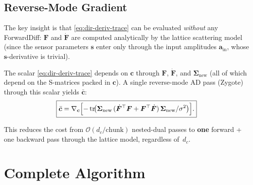 \documentclass[11pt]{article}
\newcommand{\tr}{\operatorname{tr}}
\newcommand{\bs}{\bm{s}}
\newcommand{\bc}{\bm{c}}
\newcommand{\Snew}{\bm{\Sigma}_{\mathrm{new}}}
\theoremstyle{definition}
\begin{document}
\subsection{Reverse-Mode Gradient}

The key insight is that \eqref{eq:dir-deriv-trace} can be evaluated
\emph{without} any ForwardDiff: $\bm{F}$ and $\dot{\bm{F}}$ are computed
analytically by the lattice scattering model (since the sensor parameters
$\bs$ enter only through the input amplitudes $\bm{a}_{\mathrm{in}}$,
whose $\bs$-derivative is trivial).

The scalar \eqref{eq:dir-deriv-trace} depends on $\bc$ through $\bm{F}$,
$\dot{\bm{F}}$, and $\Snew$ (all of which depend on the S-matrices
packed in $\bc$).  A single reverse-mode AD pass (Zygote) through this
scalar yields $\bar{\bc}$:
\begin{equation}
  \boxed{%
    \bar{\bc} = \nabla_{\bc}\Bigl[
      -\tr\!\bigl(\Snew\,(\dot{\bm{F}}^\top\bm{F}
      + \bm{F}^\top\dot{\bm{F}})\,\Snew/\sigma^2\bigr)
    \Bigr].
  }
  \label{eq:cbar-analytical}
\end{equation}

This reduces the cost from $\mathcal{O}(d_c/\text{chunk})$ nested-dual
passes to \textbf{one} forward + one backward pass through the lattice
model, regardless of~$d_c$.

\section{Complete Algorithm}
\label{sec:algorithm}
\end{document}
